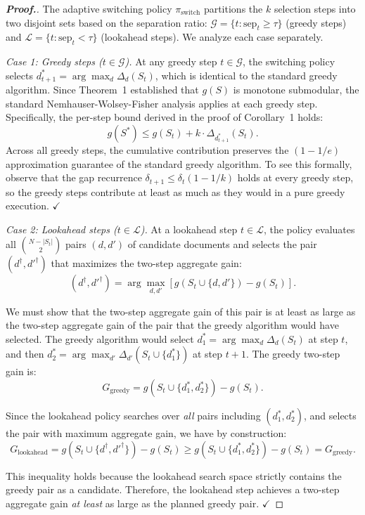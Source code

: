 \documentclass[12pt,a4paper,oneside]{report}
\theoremstyle{definition}
\theoremstyle{remark}
\begin{document}
\begin{proof}[\textbf{Proof.}]
The adaptive switching policy $\pi_{\text{switch}}$ partitions the $k$ selection steps into two disjoint sets based on the separation ratio: $\mathcal{G} = \{t : \text{sep}_t \geq \tau\}$ (greedy steps) and $\mathcal{L} = \{t : \text{sep}_t < \tau\}$ (lookahead steps). We analyze each case separately.

\medskip
\noindent\textit{Case 1: Greedy steps ($t \in \mathcal{G}$).}
At any greedy step $t \in \mathcal{G}$, the switching policy selects $d_{t+1}^* = \arg\max_{d} \Delta_d(S_t)$, which is identical to the standard greedy algorithm. Since Theorem~1 established that $g(S)$ is monotone submodular, the standard Nemhauser-Wolsey-Fisher analysis applies at each greedy step. Specifically, the per-step bound derived in the proof of Corollary~1 holds:
\[
g(S^*) \leq g(S_t) + k \cdot \Delta_{d_{t+1}^*}(S_t).
\]
Across all greedy steps, the cumulative contribution preserves the $(1-1/e)$ approximation guarantee of the standard greedy algorithm. To see this formally, observe that the gap recurrence $\delta_{t+1} \leq \delta_t(1 - 1/k)$ holds at every greedy step, so the greedy steps contribute at least as much as they would in a pure greedy execution. $\checkmark$

\medskip
\noindent\textit{Case 2: Lookahead steps ($t \in \mathcal{L}$).}
At a lookahead step $t \in \mathcal{L}$, the policy evaluates all $\binom{N - |S_t|}{2}$ pairs $(d, d')$ of candidate documents and selects the pair $(d^{\dagger}, d'^{\dagger})$ that maximizes the two-step aggregate gain:
\[
(d^{\dagger}, d'^{\dagger}) = \arg\max_{d, d'} \left[g(S_t \cup \{d, d'\}) - g(S_t)\right].
\]

We must show that the two-step aggregate gain of this pair is at least as large as the two-step aggregate gain of the pair that the greedy algorithm would have selected. The greedy algorithm would select $d^*_1 = \arg\max_d \Delta_d(S_t)$ at step $t$, and then $d^*_2 = \arg\max_{d'} \Delta_{d'}(S_t \cup \{d^*_1\})$ at step $t+1$. The greedy two-step gain is:
\[
G_{\text{greedy}} = g(S_t \cup \{d^*_1, d^*_2\}) - g(S_t).
\]

Since the lookahead policy searches over \emph{all} pairs including $(d^*_1, d^*_2)$, and selects the pair with maximum aggregate gain, we have by construction:
\[
G_{\text{lookahead}} = g(S_t \cup \{d^{\dagger}, d'^{\dagger}\}) - g(S_t) \geq g(S_t \cup \{d^*_1, d^*_2\}) - g(S_t) = G_{\text{greedy}}.
\]

This inequality holds because the lookahead search space strictly contains the greedy pair as a candidate. Therefore, the lookahead step achieves a two-step aggregate gain \emph{at least} as large as the planned greedy pair. $\checkmark$


\end{proof}
\end{document}
